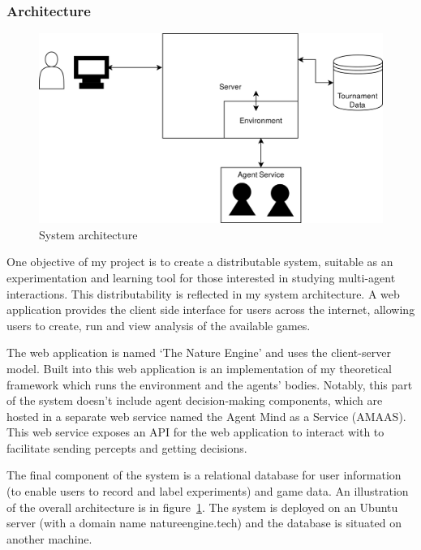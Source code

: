 \documentclass[]{final_report}
\begin{document}
\subsubsection{Architecture}
\begin{figure}
\vspace{-30pt}
\begin{framed}
	\begin{center}
	\includegraphics[width=\textwidth]{PresSystem.png}
	\caption{System architecture}
	\label{fig:architecture}
	\end{center}
\end{framed}
\vspace{-30pt}
\end{figure}
One objective of my project is to create a distributable system, suitable as an experimentation and learning tool for those interested in studying multi-agent interactions. This distributability is reflected in my system architecture. A web application provides the client side interface for users across the internet, allowing users to create, run and view analysis of the available games.\par 
The web application is named `The Nature Engine' and uses the client-server model. Built into this web application is an implementation of my theoretical framework which runs the environment and the agents' bodies. Notably, this part of the system doesn't include agent decision-making components, which are hosted in a separate web service named the Agent Mind as a Service (AMAAS). This web service exposes an API for the web application to interact with to facilitate sending percepts and getting decisions.\par 
The final component of the system is a relational database for user information (to enable users to record and label experiments) and game data. An illustration of the overall architecture is in figure~\ref{fig:architecture}. The system is deployed on an Ubuntu server (with a domain name natureengine.tech) and the database is situated on another machine.
\end{document}
